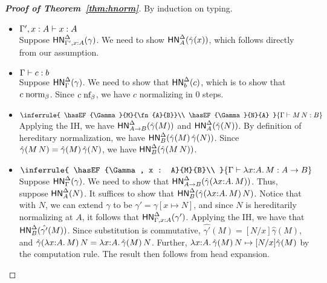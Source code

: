 \documentclass{article}
\begin{document}
\begin{proof}[\textbf{Proof of Theorem~\ref{thm:hnorm}}]
By induction on typing.
\begin{itemize}
  \setlength\itemsep{1em}
  \item $\hasEF{\Gamma', x : A}{x}{A}$\\
    Suppose $\mathsf{HN}^{\Delta}_{\Gamma', x : A}(\gamma)$.
    We need to  show $\mathsf{HN}^{\Delta}_{A}(\hat{\gamma}(x))$, which follows directly from our assumption.
  \item $\hasEF{\Gamma}{c}{b}$\\
    Suppose $\mathsf{HN}^{\Delta}_{\Gamma}(\gamma)$. We need to show that $\mathsf{HN}^{\Delta}_{b}(c)$, which is to
    show that $c \mathrel{\text{norm}_\beta}$. Since $c \mathrel{\text{nf}_\beta}$, we have $c$ normalizing in 0 steps.
  \item $\inferrule{
      \hasEF{\Gamma}{M}{\fn{A}{B}}\\
      \hasEF{\Gamma}{N}{A}
    }{\hasEF{\Gamma}{\ap{M}{N}}{B}}$\\
    Applying the IH, we have $\mathsf{HN}^{\Delta}_{A \to B}(\hat{\gamma}(M))$
    and $\mathsf{HN}^{\Delta}_{A}(\hat{\gamma}(N))$. By definition of hereditary normalization, we have
    $\mathsf{HN}^{\Delta}_{B}(\hat{\gamma}(M)\,\hat{\gamma}(N))$. Since $\hat{\gamma}(M\,N) =
    \hat{\gamma}(M)\,\hat{\gamma}(N)$, we have
    $\mathsf{HN}^{\Delta}_{B}(\hat{\gamma}(M\,N))$.
  \item
    $\inferrule{
      \hasEF{\Gamma, x : A}{M}{B}\\
    }{\hasEF{\Gamma}{\lam{x}{A}{M}}{\fn{A}{B}}}$\\
    Suppose $\mathsf{HN}^{\Delta}_{\Gamma}(\gamma)$. We need to show that
    $\mathsf{HN}^{\Delta}_{A \to B}(\hat{\gamma}(\lambda x {:} A.\, M))$.
    Thus, suppose $\mathsf{HN}^{\Delta}_{A}(N)$. It suffices to show that
    $\mathsf{HN}^{\Delta}_{B}(\hat{\gamma}(\lambda x {:} A.\, M)\,N)$. Notice that with $N$, we can extend $\gamma$ to be
    $\gamma' = \gamma[x \mapsto N]$, and since $N$ is hereditarily normalizing at $A$, it follows that
    $\mathsf{HN}^{\Delta}_{\Gamma,x : A}(\gamma')$. Applying the IH, we have that $\mathsf{HN}^{\Delta}_{B}(\hat{\gamma'}(M))$.
    Since substitution is commutative, $\hat{\gamma'}(M) = [N/x]\hat{\gamma}(M)$, and
    $\hat{\gamma}(\lambda x {:} A.\, M)\,N = \lambda x {:} A.\, \hat{\gamma}(M)\,N$. Further,
    $\lambda x {:} A.\, \hat{\gamma}(M)\,N \mapsto [N/x]\hat{\gamma}(M)$ by the computation rule. The result then follows
    from head expansion.
   \qedhere
\end{itemize}
\end{proof}
\end{document}
